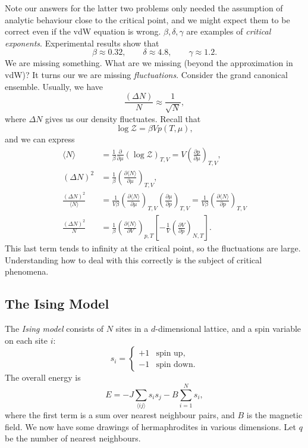 \documentclass[12pt]{article}
\begin{document}
Note our answers for the latter two problems only needed the assumption of analytic behaviour close to the critical point, and we might expect them to be correct even if the vdW equation is wrong. $\beta, \delta, \gamma$ are examples of \emph{critical exponents}. Experimental results show that
\[
\beta \approx 0.32, \qquad \delta \approx 4.8, \qquad \gamma \approx 1.2.
\]
We are missing something. What are we missing (beyond the approximation in vdW)? It turns our we are missing \emph{fluctuations}. Consider the grand canonical ensemble. Usually, we have
\[
\frac{(\Delta N)}{N} \approx \frac{1}{\sqrt N},
\]
where $\Delta N$ gives us our density fluctuates. Recall that
\[
\log \mathcal{Z} = \beta V p(T, \mu),
\]
and we can express
\begin{align*}
	\langle N \rangle &= \frac{1}{\beta} \frac{\partial}{\partial \mu}(\log \mathcal{Z})_{T, V} = V \left( \frac{\partial p}{\partial \mu} \right)_{T, V}, \\
	(\Delta N)^2 &= \frac{1}{\beta} \left( \frac{\partial \langle N \rangle}{\partial \mu} \right)_{T, V}, \\
	\frac{(\Delta N)^2}{\langle N\rangle} &= \frac{1}{V \beta} \left( \frac{\partial \langle N \rangle}{ \partial \mu} \right)_{T, V} \left( \frac{\partial \mu}{\partial p} \right)_{T, V} = \frac{1}{V \beta} \left( \frac{\partial \langle N \rangle}{\partial p} \right)_{T, V} \\
	\frac{(\Delta N)^2}{N} &= \frac{1}{\beta} \left( \frac{\partial \langle N \rangle}{\partial V} \right)_{p, T} \left[ -\frac{1}{V} \left( \frac{\partial V}{\partial p}\right)_{N, T} \right].
\end{align*}
This last term tends to infinity at the critical point, so the fluctuations are large. Understanding how to deal with this correctly is the subject of critical phenomena.

\subsection{The Ising Model}
\label{sub:is_mod}

The \emph{Ising model} consists of $N$ sites in a $d$-dimensional lattice, and a spin variable on each site $i$:
\[
s_i = 
\begin{cases}
	+1 & \text{spin up},\\
	-1 & \text{spin down}.
\end{cases}
\]
The overall energy is
\[
E = -J \sum_{\langle i j \rangle} s_i s_j - B \sum_{i = 1}^N s_i,
\]
where the first term is a sum over nearest neighbour pairs, and $B$ is the magnetic field. We now have some drawings of hermaphrodites in various dimensions. Let $q$ be the number of nearest neighbours.
\end{document}
